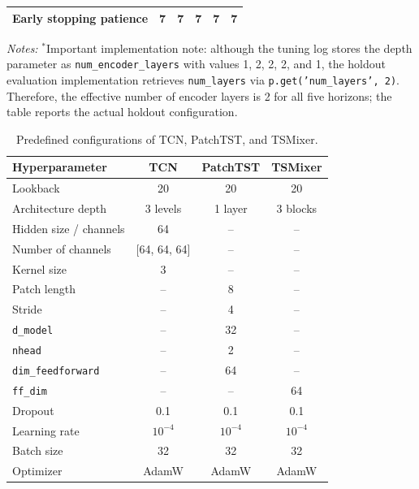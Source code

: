 \documentclass[runningheads,orivec]{llncs}
\begin{document}
\begin{table}[htbp]
\begin{tabular}{lrrrrr}
Early stopping patience & 7       & 7       & 7       & 7       & 7 \\
\hline
\end{tabular}
\par\vspace{4pt}\parbox{\linewidth}{\scriptsize\textit{Notes:} $^{\ast}$Important implementation note: although the tuning log stores the depth parameter as \texttt{num\_encoder\_layers} with values 1, 2, 2, 2, and 1, the holdout evaluation implementation retrieves \texttt{num\_layers} via \texttt{p.get('num\_layers', 2)}. Therefore, the effective number of encoder layers is 2 for all five horizons; the table reports the actual holdout configuration.}
\end{table}

\begin{table}[htbp]
\centering
\caption{Predefined configurations of TCN, PatchTST, and TSMixer.}\label{tab:config_dl_predefined}
\setlength{\tabcolsep}{6pt}
\begin{tabular}{lccc}
\hline
Hyperparameter & TCN & PatchTST & TSMixer \\
\hline
Lookback                & 20           & 20      & 20 \\
Architecture depth      & 3 levels     & 1 layer & 3 blocks \\
Hidden size / channels  & 64           & --      & -- \\
Number of channels      & [64, 64, 64] & --      & -- \\
Kernel size             & 3            & --      & -- \\
Patch length            & --           & 8       & -- \\
Stride                  & --           & 4       & -- \\
\texttt{d\_model}       & --           & 32      & -- \\
\texttt{nhead}          & --           & 2       & -- \\
\texttt{dim\_feedforward} & --         & 64      & -- \\
\texttt{ff\_dim}        & --           & --      & 64 \\
Dropout                 & 0.1          & 0.1     & 0.1 \\
Learning rate           & $10^{-4}$    & $10^{-4}$ & $10^{-4}$ \\
Batch size              & 32           & 32      & 32 \\
Optimizer               & AdamW        & AdamW   & AdamW \\

\end{tabular}
\end{table}
\end{document}

